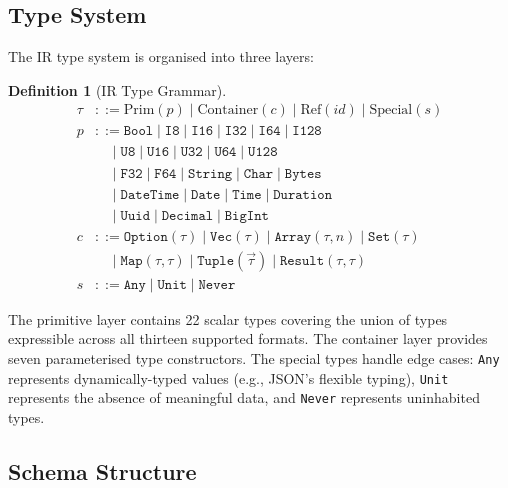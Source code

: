 \documentclass[11pt,a4paper]{article}
\theoremstyle{definition}
\newtheorem{definition}[theorem]{Definition}
\theoremstyle{remark}
\begin{document}
\subsection{Type System}

The IR type system is organised into three layers:

\begin{definition}[IR Type Grammar]\label{def:ir-grammar}
\begin{align*}
  \tau &::= \text{Prim}(p) \mid \text{Container}(c) \mid
    \text{Ref}(\mathit{id}) \mid \text{Special}(s) \\
  p &::= \texttt{Bool} \mid \texttt{I8} \mid \texttt{I16} \mid
    \texttt{I32} \mid \texttt{I64} \mid \texttt{I128} \\
    &\quad\mid \texttt{U8} \mid \texttt{U16} \mid \texttt{U32} \mid
    \texttt{U64} \mid \texttt{U128} \\
    &\quad\mid \texttt{F32} \mid \texttt{F64} \mid \texttt{String}
    \mid \texttt{Char} \mid \texttt{Bytes} \\
    &\quad\mid \texttt{DateTime} \mid \texttt{Date} \mid \texttt{Time}
    \mid \texttt{Duration} \\
    &\quad\mid \texttt{Uuid} \mid \texttt{Decimal} \mid
    \texttt{BigInt} \\
  c &::= \texttt{Option}(\tau) \mid \texttt{Vec}(\tau) \mid
    \texttt{Array}(\tau, n) \mid \texttt{Set}(\tau) \\
    &\quad\mid \texttt{Map}(\tau, \tau) \mid \texttt{Tuple}(\vec\tau)
    \mid \texttt{Result}(\tau, \tau) \\
  s &::= \texttt{Any} \mid \texttt{Unit} \mid \texttt{Never}
\end{align*}
\end{definition}

The primitive layer contains 22 scalar types covering the union of
types expressible across all thirteen supported formats. The container
layer provides seven parameterised type constructors. The special
types handle edge cases: \texttt{Any} represents dynamically-typed
values (e.g., JSON's flexible typing), \texttt{Unit} represents
the absence of meaningful data, and \texttt{Never} represents
uninhabited types.

\subsection{Schema Structure}
\end{document}
